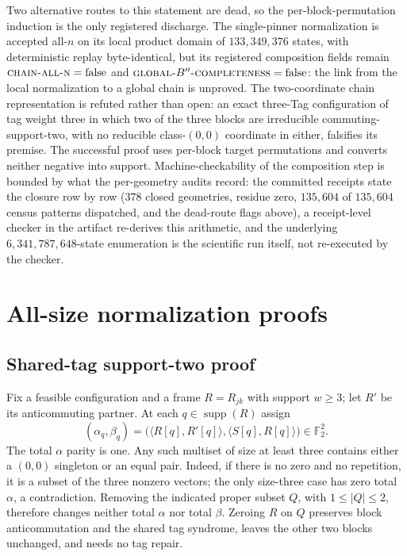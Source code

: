 \documentclass[a4paper,onecolumn,11pt,unpublished,noarxiv]{quantumarticle}
\begin{document}
Two alternative routes to this statement are dead, so the per-block-permutation induction is the only registered discharge.  The single-pinner normalization is accepted all-$n$ on its local product domain of $133{,}349{,}376$ states, with deterministic replay byte-identical, but its registered composition fields remain $\textsc{chain-all-n}=\mathrm{false}$ and $\textsc{global-}B''\textsc{-completeness}=\mathrm{false}$: the link from the local normalization to a global chain is unproved.  The two-coordinate chain representation is refuted rather than open: an exact three-Tag configuration of tag weight three in which two of the three blocks are irreducible commuting-support-two, with no reducible class-$(0,0)$ coordinate in either, falsifies its premise.  The successful proof uses per-block target permutations and converts neither negative into support.  Machine-checkability of the composition step is bounded by what the per-geometry audits record: the committed receipts state the closure row by row ($378$ closed geometries, residue zero, $135{,}604$ of $135{,}604$ census patterns dispatched, and the dead-route flags above), a receipt-level checker in the artifact re-derives this arithmetic, and the underlying $6{,}341{,}787{,}648$-state enumeration is the scientific run itself, not re-executed by the checker.

\section{All-size normalization proofs}\label{sec:normalization-proofs}

\subsection{Shared-tag support-two proof}

Fix a feasible configuration and a frame $R=R_{jk}$ with support $w\ge3$; let $R'$ be its anticommuting partner.  At each $q\in\operatorname{supp}(R)$ assign
\begin{equation}
(\alpha_q,\beta_q)=\bigl(\langle R[q],R'[q]\rangle,\langle S[q],R[q]\rangle\bigr)\in\mathbb F_2^2.
\end{equation}
The total $\alpha$ parity is one.  Any such multiset of size at least three contains either a $(0,0)$ singleton or an equal pair.  Indeed, if there is no zero and no repetition, it is a subset of the three nonzero vectors; the only size-three case has zero total $\alpha$, a contradiction.  Removing the indicated proper subset $Q$, with $1\le|Q|\le2$, therefore changes neither total $\alpha$ nor total $\beta$.  Zeroing $R$ on $Q$ preserves block anticommutation and the shared tag syndrome, leaves the other two blocks unchanged, and needs no tag repair.
\end{document}
